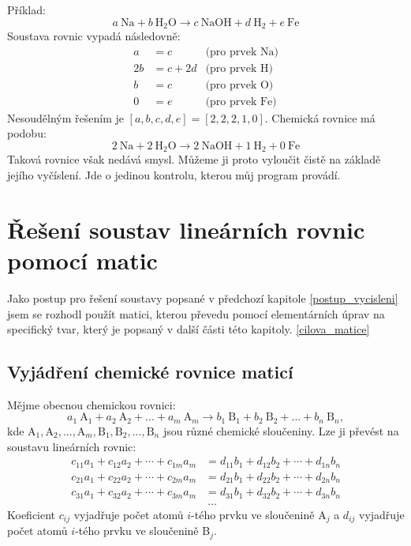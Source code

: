 \documentclass[12pt,a4paper]{report}
\newcommand{\n}[1]{\mbox{#1}}
\newcommand{\sipka}{\rightarrow}
\begin{document}
Příklad:
$$a~\n{Na} + b~\n{H}_2\n{O} \sipka c~\n{NaOH}+d~\n{H}_2 + e~\n{Fe}$$
Soustava rovnic vypadá následovně:
\begin{align*}
	a &= c &\mbox{(pro prvek Na)}\\
	2b &= c + 2d &\mbox{(pro prvek H)}\\
	b &= c &\mbox{(pro prvek O)}\\
	0 &= e &\mbox{(pro prvek Fe)}
\end{align*} 
Nesoudělným řešením je $[a,b,c,d,e]=[2,2,2,1,0]$. Chemická rovnice má podobu:
$$2~\n{Na} + 2~\n{H}_2\n{O} \sipka 2~\n{NaOH}+1~\n{H}_2 + 0~\n{Fe}$$
Taková rovnice však nedává smysl. Můžeme ji proto vyloučit čistě na základě jejího vyčíslení. Jde o jedinou kontrolu, kterou můj program provádí.

\chapter{Řešení soustav lineárních rovnic pomocí matic}
\label{k2}
Jako postup pro řešení soustavy popsané v předchozí kapitole \ref{postup_vycisleni} jsem se rozhodl použít matici, kterou převedu pomocí elementárních úprav na specifický tvar, který je popsaný v další části této kapitoly. \ref{cilova_matice}

\section{Vyjádření chemické rovnice maticí \cite{czu}}
Mějme obecnou chemickou rovnici:
$$a_1~\n{A}_1 + a_2~\n{A}_2 + ... + a_m~\n{A}_m \sipka b_1~\n{B}_1 + b_2~\n{B}_2 + ...+ b_n~\n{B}_n,$$
kde $\n{A}_1, \n{A}_2, ..., \n{A}_m, \n{B}_1, \n{B}_2, ..., \n{B}_n$ jsou různé chemické sloučeniny. Lze ji převést na soustavu lineárních rovnic:
\begin{align*}
	c_{11}a_{1} + c_{12}a_{2} + \cdots + c_{1m}a_{m} &= d_{11}b_{1} + d_{12}b_{2} + \cdots + d_{1n}b_{n}\\
	c_{21}a_{1} + c_{22}a_{2} + \cdots + c_{2m}a_{m} &= d_{21}b_{1} + d_{22}b_{2} + \cdots + d_{2n}b_{n}\\
	c_{31}a_{1} + c_{32}a_{2} + \cdots + c_{3m}a_{m} &= d_{31}b_{1} + d_{32}b_{2} + \cdots + d_{3n}b_{n}\\
	&~...
\end{align*}
Koeficient $ c_{ij} $ vyjadřuje počet atomů $ i $-tého prvku ve sloučenině A$ _j $ a $ d_{ij} $ vyjadřuje počet atomů $ i $-tého prvku ve sloučenině B$ _j $.
\end{document}
